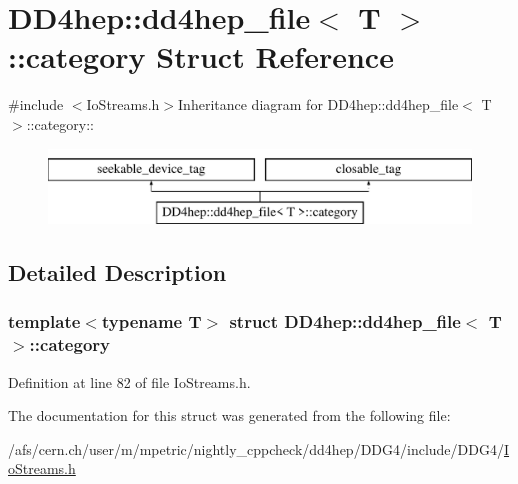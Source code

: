 \hypertarget{struct_d_d4hep_1_1dd4hep__file_1_1category}{
\section{DD4hep::dd4hep\_\-file$<$ T $>$::category Struct Reference}
\label{struct_d_d4hep_1_1dd4hep__file_1_1category}
}


{\ttfamily \#include $<$IoStreams.h$>$}Inheritance diagram for DD4hep::dd4hep\_\-file$<$ T $>$::category::\begin{figure}[H]
\begin{center}
\leavevmode
\includegraphics[height=2cm]{struct_d_d4hep_1_1dd4hep__file_1_1category}
\end{center}
\end{figure}


\subsection{Detailed Description}
\subsubsection*{template$<$typename T$>$ struct DD4hep::dd4hep\_\-file$<$ T $>$::category}



Definition at line 82 of file IoStreams.h.

The documentation for this struct was generated from the following file:\begin{DoxyCompactItemize}
\item 
/afs/cern.ch/user/m/mpetric/nightly\_\-cppcheck/dd4hep/DDG4/include/DDG4/\hyperlink{_io_streams_8h}{IoStreams.h}\end{DoxyCompactItemize}
